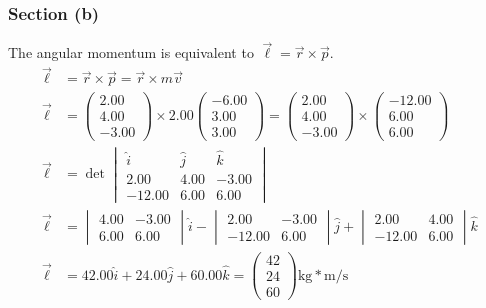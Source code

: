 \documentclass[12pt]{article}
\begin{document}
\subsubsection{Section (b)}
The angular momentum is equivalent to \(\vec{\ell} = \vec{r}\times\vec{p}\).
\begin{align}
    \vec{\ell}  &=  \vec{r} \times \vec{p}
        =   \vec{r} \times m\vec{v}\\
    \vec{\ell}  &=  \begin{pmatrix}2.00\\4.00\\-3.00\end{pmatrix} \times 2.00\begin{pmatrix}-6.00\\3.00\\3.00\end{pmatrix}
        =   \begin{pmatrix}2.00\\4.00\\-3.00\end{pmatrix} \times \begin{pmatrix}-12.00\\6.00\\6.00\end{pmatrix}\\
    \vec{\ell}  &=  \det\begin{vmatrix}
                            \hat{i} &\hat{j}&\hat{k}\\
                            2.00    &4.00   &-3.00  \\
                            -12.00  &6.00   &6.00
                        \end{vmatrix}\\
    \vec{\ell}  &=  \begin{vmatrix}4.00&-3.00\\6.00&6.00\end{vmatrix}\hat{i} -
                    \begin{vmatrix}2.00&-3.00\\-12.00&6.00\end{vmatrix}\hat{j} + 
                    \begin{vmatrix}2.00&4.00\\-12.00&6.00\end{vmatrix}\hat{k}\\
    \vec{\ell}  &=  42.00\hat{i} + 24.00\hat{j} + 60.00\hat{k} 
        = \boxed{\begin{pmatrix}42\\24\\60\end{pmatrix}\unit{\kilo\gram*\meter/\second}}
\end{align}
\end{document}

